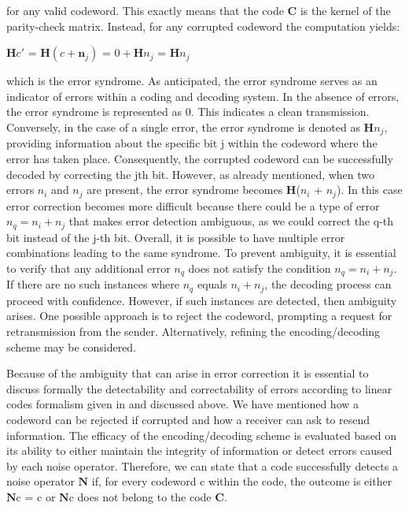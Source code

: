 \documentclass{Configuration_Files/PoliMi3i_thesis}
\begin{document}
for any valid codeword. This exactly means that the code {\bf C} is the kernel of the parity-check matrix.\newline
Instead, for any corrupted codeword the computation yields:

\begin{center}
	$\textbf{H}c'$ = $\textbf{H} ( c + \textbf{n}_j )$ = $0 + \textbf{H} n_j $  = $\textbf{H}n_j $ 
\end{center}

which is the error syndrome. As anticipated, the error syndrome serves as an indicator of errors within a coding and decoding system. In the absence of errors, the error syndrome is represented as 0. This indicates a clean transmission. Conversely, in the case of a single error, the error syndrome is denoted as {\bf H}$n_j$, providing information about the specific bit j within the codeword where the error has taken place. Consequently, the corrupted codeword can be successfully decoded by correcting the jth bit. However, as already mentioned, when two errors $n_i$ and $n_j$ are present, the error syndrome becomes {\bf H}($n_i$ + $n_j$). In this case error correction becomes more difficult because there could be a type of error $n_q = n_i + n_j$ that makes error detection ambiguous, as we could correct the q-th bit instead of the j-th bit. Overall, it is possible to have multiple error combinations leading to the same syndrome. To prevent ambiguity, it is essential to verify that any additional error $n_q$ does not satisfy the condition $n_q = n_i + n_j$. If there are no such instances where $n_q$ equals $ n_i + n_j$, the decoding process can proceed with confidence. However, if such instances are detected, then ambiguity arises. One possible approach is to reject the codeword, prompting a request for retransmission from the sender. Alternatively, refining the encoding/decoding scheme may be considered. \newline

Because of the ambiguity that can arise in error correction it is essential to discuss formally the detectability and correctability of errors according to linear codes formalism given in \cite{Cha06} and discussed above.
We have mentioned how a codeword can be rejected if corrupted and how a receiver can ask to resend information. The efficacy of the encoding/decoding scheme is evaluated based on its ability to either maintain the integrity of information or detect errors caused by each noise operator. Therefore, we can state that a code successfully detects a noise operator $\textbf{N}$ if, for every codeword c within the code, the outcome is either $\textbf{N}$c = c or $\textbf{N}$c does not belong to the code $\textbf{C}$.
\end{document}
